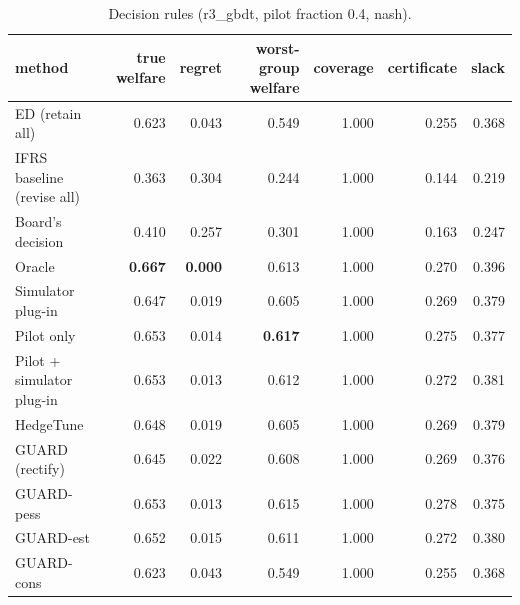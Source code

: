 \begin{table}[t]
\centering
\small
\begin{tabular}{lrrrrrr}
\toprule
method & true welfare & regret & worst-group welfare & coverage & certificate & slack \\
\midrule
ED (retain all) & 0.623 & 0.043 & 0.549 & 1.000 & 0.255 & 0.368 \\
IFRS baseline (revise all) & 0.363 & 0.304 & 0.244 & 1.000 & 0.144 & 0.219 \\
Board's decision & 0.410 & 0.257 & 0.301 & 1.000 & 0.163 & 0.247 \\
Oracle & \textbf{0.667} & \textbf{0.000} & 0.613 & 1.000 & 0.270 & 0.396 \\
Simulator plug-in & 0.647 & 0.019 & 0.605 & 1.000 & 0.269 & 0.379 \\
Pilot only & 0.653 & 0.014 & \textbf{0.617} & 1.000 & 0.275 & 0.377 \\
Pilot + simulator plug-in & 0.653 & 0.013 & 0.612 & 1.000 & 0.272 & 0.381 \\
HedgeTune & 0.648 & 0.019 & 0.605 & 1.000 & 0.269 & 0.379 \\
GUARD (rectify) & 0.645 & 0.022 & 0.608 & 1.000 & 0.269 & 0.376 \\
GUARD-pess & 0.653 & 0.013 & 0.615 & 1.000 & 0.278 & 0.375 \\
GUARD-est & 0.652 & 0.015 & 0.611 & 1.000 & 0.272 & 0.380 \\
GUARD-cons & 0.623 & 0.043 & 0.549 & 1.000 & 0.255 & 0.368 \\
\bottomrule
\end{tabular}
\caption{Decision rules (r3\_gbdt, pilot fraction 0.4, nash).}
\label{tab:methods-nash}
\end{table}
